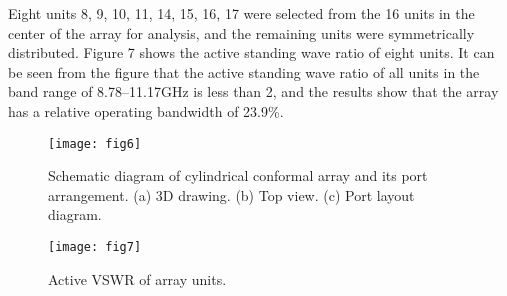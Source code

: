 \documentclass[USenglish]{article}
\theoremstyle{dgthm}
\theoremstyle{dgdef}
\begin{document}
Eight units 8, 9, 10, 11, 14, 15, 16, 17 were selected from the 16 units in the center of the array for analysis, and the remaining units were symmetrically distributed. Figure 7 shows the active standing wave ratio of eight units. It can be seen from the figure that the active standing wave ratio of all units in the band range of 8.78--11.17GHz is less than 2, and the results show that the array has a relative operating bandwidth of 23.9\%.
\begin{figure}
	\centering
	\texttt{[image: fig6]}
	\caption{Schematic diagram of cylindrical conformal array and its port arrangement. (a) 3D drawing. (b) Top view. (c) Port layout diagram.}
\end{figure}
\begin{figure}
	\centering
	\texttt{[image: fig7]}
	\caption{Active VSWR of array units.}
\end{figure}
\end{document}
